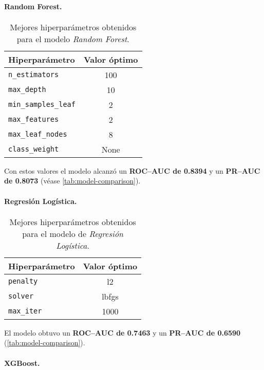 \documentclass[12pt]{article}
\begin{document}
\paragraph{Random Forest.}

\begin{table}[H]
\centering
\caption{Mejores hiperparámetros obtenidos para el modelo \textit{Random Forest}.}
\label{tab:rf-params}
\begin{tabular}{lc}
\toprule
\textbf{Hiperparámetro} & \textbf{Valor óptimo} \\
\midrule
\texttt{n\_estimators}       & 100  \\
\texttt{max\_depth}          & 10   \\
\texttt{min\_samples\_leaf}  & 2    \\
\texttt{max\_features}       & 2    \\
\texttt{max\_leaf\_nodes}    & 8    \\
\texttt{class\_weight}       & None \\
\bottomrule
\end{tabular}
\end{table}

Con estos valores el modelo alcanzó un \textbf{ROC–AUC de 0.8394} y un \textbf{PR–AUC de 0.8073} (véase \autoref{tab:model-comparison}).

\paragraph{Regresión Logística.}

\begin{table}[H]
\centering
\caption{Mejores hiperparámetros obtenidos para el modelo de \textit{Regresión Logística}.}
\label{tab:lr-params}
\begin{tabular}{lc}
\toprule
\textbf{Hiperparámetro} & \textbf{Valor óptimo} \\
\midrule
\texttt{penalty}   & l2 \\
\texttt{solver}    & lbfgs \\
\texttt{max\_iter} & 1000 \\
\bottomrule
\end{tabular}
\end{table}

El modelo obtuvo un \textbf{ROC–AUC de 0.7463} y un \textbf{PR–AUC de 0.6590} (\autoref{tab:model-comparison}).

\paragraph{XGBoost.}
\end{document}
